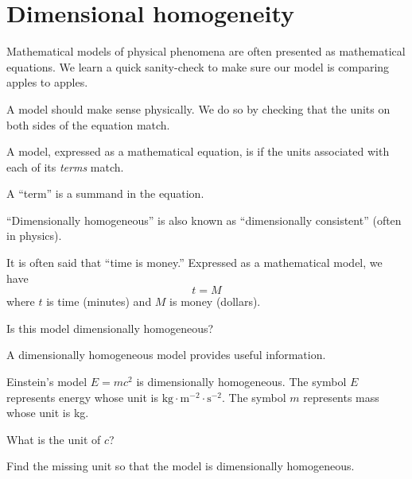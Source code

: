 \documentclass[../main.tex]{subfiles}
\begin{document}
 \section{Dimensional homogeneity}

Mathematical models of physical phenomena are often presented as mathematical equations. We learn a quick sanity-check to make sure our model is comparing apples to apples.

A model should make sense physically. We do so by checking that the units on both sides of the equation match.

\begin{mdframed}[style=simple-compact]
  A model, expressed as a mathematical equation, is  if the units associated with each of its \emph{terms} match.
\end{mdframed}

A ``term'' is a summand in the equation.

\faPencil*{} ``Dimensionally homogeneous'' is also known as ``dimensionally consistent'' (often in physics).

\begin{example}
  It is often said that ``time is money.'' Expressed as a mathematical model, we have 
  \[
    t = M
  \]
  where \(t\) is time (minutes) and \(M\) is money (dollars).

  Is this model dimensionally homogeneous?
\end{example}

A dimensionally homogeneous model provides useful information. 
\begin{example}
  Einstein's model \(E = mc^{2}\) is dimensionally homogeneous. The symbol \(E\) represents energy whose unit is \(\text{kg} \cdot \text{m}^{-2} \cdot \text{s}^{-2}\). The symbol \(m\) represents mass whose unit is kg. 

  What is the unit of \(c\)?
\end{example}

\begin{example}
  Find the missing unit so that the model is dimensionally homogeneous.
\end{example}
\end{document}
